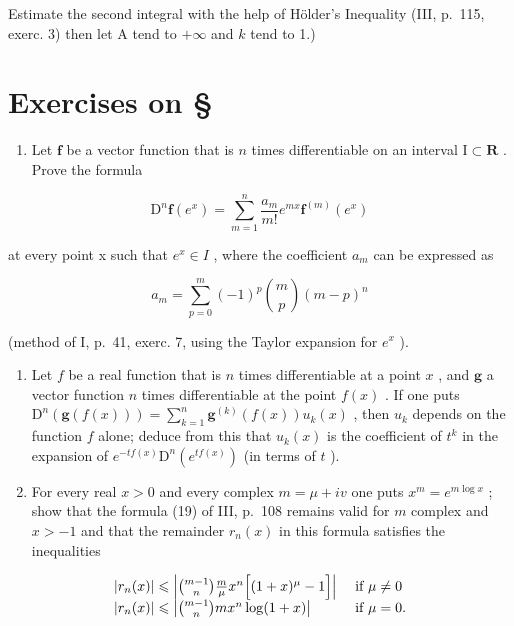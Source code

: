 Estimate the second integral with the help of Hölder's Inequality (III, p.~115, exerc. 3) then let A tend to \(+\infty\) and \(k\) tend to 1.)

\setcounter{exercisegroup}{1}
\section*{Exercises on \S{}}
{}

\begin{enumerate}
\def\labelenumi{\arabic{enumi})}
\tightlist
\item
  Let \(\mathbf{f}\) be a vector function that is \(n\) times differentiable on an interval \(\mathrm{I} \subset \mathbf{R}\) . Prove the formula
\end{enumerate}

\[
\mathrm{D} ^ {n} \mathbf {f} \left(e ^ {x}\right) = \sum_ {m = 1} ^ {n} \frac {a _ {m}}{m !} e ^ {m x} \mathbf {f} ^ {(m)} \left(e ^ {x}\right)
\]

at every point x such that \(e^{x} \in I\) , where the coefficient \(a_{m}\) can be expressed as

\[
a _ {m} = \sum_ {p = 0} ^ {m} (- 1) ^ {p} \binom {m} {p} (m - p) ^ {n}
\]

(method of I, p.~41, exerc. 7, using the Taylor expansion for \(e^{x}\) ).

\begin{enumerate}
\def\labelenumi{\arabic{enumi})}
\setcounter{enumi}{1}
\item
  Let \(f\) be a real function that is \(n\) times differentiable at a point \(x\) , and \(\mathbf{g}\) a vector function \(n\) times differentiable at the point \(f(x)\) . If one puts \(\mathrm{D}^n(\mathbf{g}(f(x))) = \sum_{k=1}^{n} \mathbf{g}^{(k)}(f(x)) u_k(x)\) , then \(u_k\) depends on the function \(f\) alone; deduce from this that \(u_k(x)\) is the coefficient of \(t^k\) in the expansion of \(e^{-tf(x)}\mathrm{D}^n(e^{tf(x)})\) (in terms of \(t\) ).
\item
  For every real \(x > 0\) and every complex \(m = \mu + iv\) one puts \(x^{m} = e^{m\log x}\) ; show that the formula (19) of III, p.~108 remains valid for \(m\) complex and \(x > -1\) and that the remainder \(r_{n}(x)\) in this formula satisfies the inequalities
\end{enumerate}

\[
\begin{array}{l l} | r _ {n} (x) | \leqslant \left| \binom {m - 1} {n} \frac {m}{\mu} x ^ {n} \Big [ (1 + x) ^ {\mu} - 1 \Big ] \right| & \text { if } \mu \neq 0 \\ | r _ {n} (x) | \leqslant \left| \binom {m - 1} {n} m x ^ {n} \log (1 + x) \right| & \text { if } \mu = 0. \end{array}
\]

